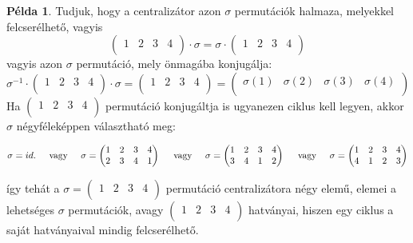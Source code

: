 \documentclass[12pt]{book}
\theoremstyle{plain} %
\theoremstyle{definition} %
\newtheorem{pl}{Példa}[section]
\theoremstyle{remark}
\numberwithin{equation}{section}  %
\begin{document}
\begin{pl}
		Tudjuk, hogy a centralizátor azon $\sigma$ permutációk halmaza, melyekkel felcserélhető, vagyis
		\[ \begin{pmatrix}
		1 & 2 & 3 & 4 \\
		\end{pmatrix} \cdot \sigma = 
		\sigma \cdot
		\begin{pmatrix}
		1 & 2 & 3 & 4 \\
		\end{pmatrix}  \]
		vagyis azon $\sigma$ permutáció, mely önmagába konjugálja:
		\[ \sigma^{-1} \cdot 
		\begin{pmatrix}
		1 & 2 & 3 & 4 \\
		\end{pmatrix}
		\cdot \sigma = 
		\begin{pmatrix}
		1 & 2 & 3 & 4 \\
		\end{pmatrix} =
		\begin{pmatrix}
		\sigma(1) & \sigma(2) & \sigma(3) & \sigma(4) \\
		\end{pmatrix} \]
		Ha $\begin{pmatrix}
		1 & 2 & 3 & 4 \\
		\end{pmatrix}$ permutáció konjugáltja is ugyanezen ciklus kell legyen, akkor $\sigma$ négyféleképpen választható meg:
		\begin{small}
		\[ \sigma = 
		id. \hspace{5mm} \text{vagy} \hspace{5mm} \sigma = 
		\begin{pmatrix}
		1 & 2 & 3 & 4 \\
		2 & 3 & 4 & 1 \\
		\end{pmatrix} \hspace{5mm} \text{vagy} \hspace{5mm} \sigma = 
		\begin{pmatrix}
		1 & 2 & 3 & 4 \\
		3 & 4 & 1 & 2 \\
		\end{pmatrix}
		\hspace{5mm} \text{vagy} \hspace{5mm} \sigma = 
		\begin{pmatrix}
		1 & 2 & 3 & 4 \\
		4 & 1 & 2 & 3 \\
		\end{pmatrix} \]
		\end{small}
	    így tehát a $\sigma = 
		\begin{pmatrix}
		1 & 2 & 3 & 4 \\
		\end{pmatrix}$ permutáció centralizátora négy elemű, elemei a lehetséges $\sigma$ permutációk, avagy $
		\begin{pmatrix}
		1 & 2 & 3 & 4 \\
		\end{pmatrix}$ hatványai, hiszen egy ciklus a saját hatványaival mindig felcserélhető.
		

\end{pl}
\end{document}
